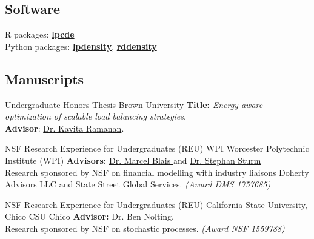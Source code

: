 \documentclass[10pt,a4paper,roman]{moderncv}        %
\begin{document}

\subsection{Software}
R packages:
\color{blue}\href{https://nppackages.github.io/lpcde/}{\textbf{lpcde}}\color{black}
\\
Python packages: \color{blue}\href{https://nppackages.github.io/lpdensity_doc/}
{\textbf{lpdensity}}\color{black},
\color{blue}\href{https://rdpackages.github.io/rddensity_doc/}
{\textbf{rddensity}}\color{black}

\subsection{Manuscripts}
{Undergraduate Honors Thesis}
{Brown University}{}
{\textbf{Title:} \textit{Energy-aware optimization of scalable load balancing strategies}.\\
  \textbf{Advisor}: \color{blue}\href{https://www.brown.edu/academics/applied-mathematics/faculty/kavita-ramanan/home}
  {Dr. Kavita Ramanan}\color{black}.
}

{NSF Research Experience for Undergraduates (REU) }
{WPI}
{Worcester Polytechnic Institute (WPI)}
{\textbf{Advisors:}
  \color{blue}\href{https://www.wpi.edu/people/faculty/myblais}{Dr. Marcel Blais
  }\color{black}
  and \color{blue}\href{https://www.wpi.edu/people/faculty/ssturm}{Dr. Stephan Sturm
  }\color{black}
  \\
  Research sponsored by NSF on financial modelling
  with industry liaisons Doherty Advisors LLC and State Street Global Services.
  \textit{(Award DMS 1757685)}
}

{NSF Research Experience for Undergraduates (REU)}
{California State University, Chico}
{CSU Chico}
{\textbf{Advisor:} Dr. Ben Nolting.
  \\
 Research sponsored by NSF on stochastic processes.
\textit{(Award NSF 1559788)}}
\end{document}
